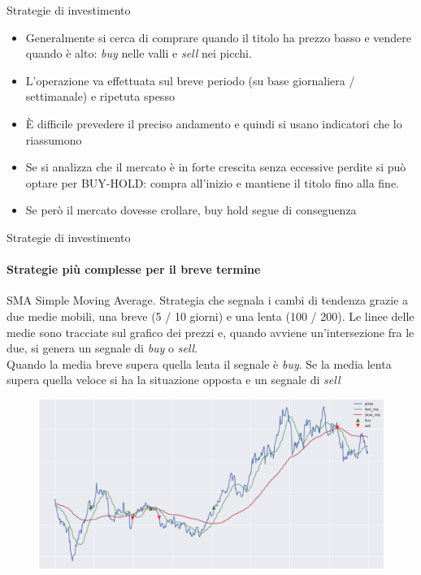 \documentclass{beamer}
\begin{document}
\begin{frame}{Strategie di investimento}
\begin{itemize}
    \item Generalmente si cerca di comprare quando il titolo ha prezzo basso e vendere quando è alto: \textit{buy} nelle valli e \textit{sell} nei picchi. 
    \item L'operazione va effettuata sul breve periodo (su base giornaliera / settimanale) e ripetuta spesso
    \item È difficile prevedere il preciso andamento e quindi si usano indicatori che lo riassumono
    \item Se si analizza che il mercato è in forte crescita senza eccessive perdite si può optare per BUY-HOLD: compra all'inizio e mantiene il titolo fino alla fine.
    \item Se però il mercato dovesse crollare, buy hold segue di conseguenza
\end{itemize}
\end{frame}

\begin{frame}{Strategie di investimento}
\framesubtitle{Strategie più complesse per il breve termine}
\begin{itemize}
    \begin{block}{SMA}
    Simple Moving Average. Strategia che segnala i cambi di tendenza grazie a due medie mobili, una breve (5 / 10 giorni) e una lenta (100 / 200). Le linee delle medie sono tracciate sul grafico dei prezzi e, quando avviene un'intersezione fra le due, si genera un segnale di \textit{buy} o \textit{sell}.\\ Quando la media breve supera quella lenta il segnale è \textit{buy}. Se la media lenta supera quella veloce si ha la situazione opposta e un segnale di \textit{sell}
    \end{block}
    \begin{figure}
        \centering
        \includegraphics[width=.5\linewidth]{moving_avg2}
    \end{figure}
\end{itemize}
\end{frame}
\end{document}
